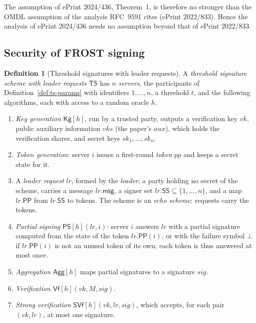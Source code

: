 \documentclass[11pt,a4paper]{article}
\theoremstyle{definition}
\newtheorem{definition}[theorem]{Definition}
\begin{document}
The assumption of ePrint 2024/436, Theorem~1, is therefore no stronger than
the OMDL assumption of the analysis RFC~9591 cites (ePrint 2022/833). Hence
the analysis of ePrint 2024/436 needs no assumption beyond that of ePrint
2022/833.

\subsection{Security of FROST signing}\label{sec:sec-frost}

\begin{definition}[Threshold signatures with leader requests]
\label{def:ni-syntax}
A \emph{threshold signature scheme with leader requests} \(\mathsf{TS}\) has
\(n\) \emph{servers}, the participants of Definition~\ref{def:ts-params}
with identifiers \(1, \dots, n\), a threshold \(t\), and the following
algorithms, each with access to a random oracle \(h\).
\begin{enumerate}
\item \emph{Key generation} \(\mathsf{Kg}[h]\), run by a trusted party,
  outputs a verification key \(\mathit{vk}\), public auxiliary information
  \(\mathit{vks}\) (the paper's \(\mathit{aux}\)), which holds the
  verification shares, and secret keys
  \(\mathit{sk}_1, \dots, \mathit{sk}_n\).
\item \emph{Token generation}: server \(i\) issues a first-round
  \emph{token} \(\mathit{pp}\) and keeps a secret state for it.
\item A \emph{leader request} \(\mathit{lr}\), formed by the \emph{leader},
  a party holding no secret of the scheme, carries a message
  \(\mathit{lr}.\mathsf{msg}\), a signer set
  \(\mathit{lr}.\mathsf{SS} \subseteq \{1, \dots, n\}\), and a map
  \(\mathit{lr}.\mathsf{PP}\) from \(\mathit{lr}.\mathsf{SS}\) to tokens. The
  scheme is an \emph{echo
  scheme}: requests carry the tokens.
\item \emph{Partial signing} \(\mathsf{PS}[h](\mathit{lr}, i)\): server
  \(i\) answers \(\mathit{lr}\) with a partial signature computed from the
  state of the token \(\mathit{lr}.\mathsf{PP}(i)\), or with the failure
  symbol \(\bot\) if \(\mathit{lr}.\mathsf{PP}(i)\) is not an unused token of
  its own; each token is thus answered at most once.
\item \emph{Aggregation} \(\mathsf{Agg}[h]\) maps partial signatures to a
  signature \(\mathit{sig}\).
\item \emph{Verification} \(\mathsf{Vf}[h](\mathit{vk}, M, \mathit{sig})\).
\item \emph{Strong verification}
  \(\mathsf{SVf}[h](\mathit{vk}, \mathit{lr}, \mathit{sig})\), which
  accepts, for each pair \((\mathit{vk}, \mathit{lr})\), at most one
  signature.
\end{enumerate}
\end{definition}
\end{document}
